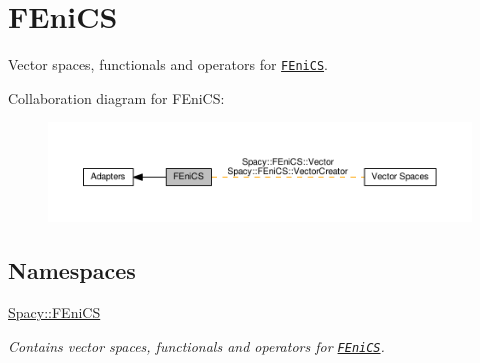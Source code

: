 \hypertarget{group__FenicsGroup}{}\section{F\+Eni\+C\+S}
\label{group__FenicsGroup}


Vector spaces, functionals and operators for \href{http://www.fenicsproject.org}{\tt F\+Eni\+C\+S}.  


Collaboration diagram for F\+Eni\+C\+S\+:\nopagebreak
\begin{figure}[H]
\begin{center}
\leavevmode
\includegraphics[width=350pt]{group__FenicsGroup}
\end{center}
\end{figure}
\subsection*{Namespaces}
\begin{DoxyCompactItemize}
\item 
 \hyperlink{namespaceSpacy_1_1FEniCS}{Spacy\+::\+F\+Eni\+C\+S}
\begin{DoxyCompactList}\small\item\em Contains vector spaces, functionals and operators for \href{www.fenicsproject.org}{\tt F\+Eni\+C\+S}. \end{DoxyCompactList}\end{DoxyCompactItemize}
